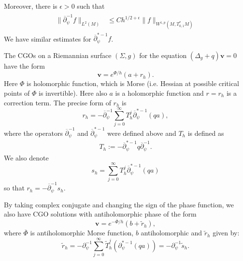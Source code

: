 \documentclass[a4paper, 10pt, twoside, notitlepage]{amsart}
\theoremstyle{plain}
\numberwithin{equation}{section}
\newcommand {\p} {\partial}
\newcommand{\eps}{\epsilon}
\newcommand{\norm}[1]{\lVert #1 \rVert}
\newcommand{\op}{\overline \p}
\begin{document}
Moreover, there is $\eps>0$ such that 
\begin{align}\label{eq:sobo_decayL2}
\begin{split}
 \norm{\overline \p_\psi^{-1}f}_{L^2(M)}&\leq C h^{1/2+\eps}\norm{f}_{W^{1,p}(M, T_{0,1}^*M)} %
 \end{split}
\end{align}
We have similar estimates for $\op_\psi^{*-1}f$. 


The CGOs on a Riemannian surface $(\Sigma,g)$ for the equation $(\Delta_g + q)\mathbf{v}=0$ have the form
\begin{equation}\label{eq:CGO_def}
			\mathbf{v}=e^{\Phi/h}(a+r_h).
\end{equation}
Here $\Phi$ 
 is holomorphic function, which is Morse (i.e. Hessian at possible critical points of $\Phi$ is invertible). Here also $a$ is a holomorphic function and $r=r_h$ is a correction term. The precise form of $r_h$ is 
\begin{equation}\label{eq:rh_form}
 r_h=-  \overline{\p}_\psi^{-1}\sum_{j=0}^\infty T_h^j\op_\psi^{*-1}(qa),
\end{equation}
where the operators $\overline{\p}_\psi^{-1}$ and $\op_\psi^{*-1}$ were defined above and $T_h$ is defined as
\begin{eqnarray}\label{def: Th}
 T_h:=-\op_\psi^{*-1}q\overline\p_\psi^{-1}.
\end{eqnarray}
We also denote
\begin{equation}\label{eq:sh_formula}
s_h=\sum_{j=0}^\infty T_h^j\op_\psi^{*-1}(qa)
\end{equation}
so that $r_h=-\overline{\p}_\psi^{-1}s_h$.

By taking complex conjugate and changing the sign of the phase function, we also have CGO solutions with antiholomorphic phase of the form
\begin{equation}\label{eq:CGO_def_antiholom}
			\mathbf{v}=e^{-\overline \Phi/h}(b+\tilde r_h),
\end{equation}
where $\overline \Phi$ is antiholomorphic Morse function, $b$ antiholomorphic and $\tilde r_h$ given by:
\begin{equation}\label{eq:tilde_rh_formula}
 \tilde r_h=-\p_\psi^{-1}\sum_{j=0}^\infty \tilde T_h^j(\p_{\psi}^{*-1} (q a))=-\p_\psi^{-1}\tilde s_h.
\end{equation}
\end{document}
